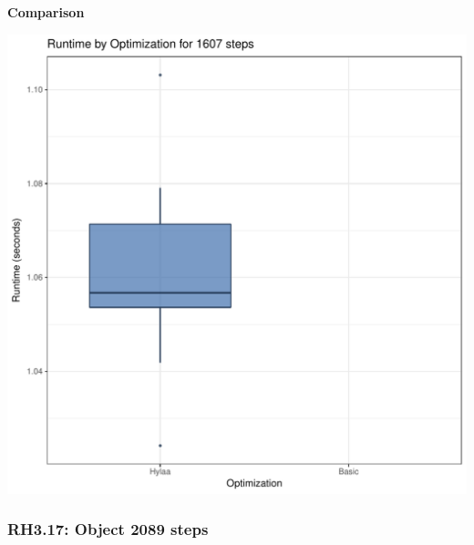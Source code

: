 \documentclass{article}\usepackage[]{graphicx}\usepackage[]{color}
\makeatletter
\def\maxwidth{ %
  \ifdim\Gin@nat@width>\linewidth
    \linewidth
  \else
    \Gin@nat@width
  \fi
}
\newenvironment{knitrout}{}{} %
\makeatother
\begin{document}
 \textbf{Comparison}
  
\begin{knitrout}
\color{fgcolor}
\includegraphics[width=\maxwidth]{figure/RH3_steps1607-1} 

\end{knitrout}


\subsubsection{RH3.17: Object 2089 steps}
\end{document}
